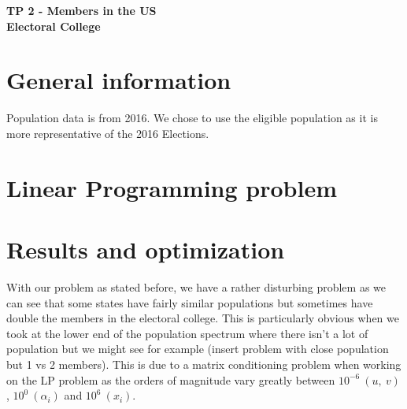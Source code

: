 \documentclass[a4paper,10pt,calibri,oneside,openany, twocolumn]{report}
\theoremstyle{break}
\begin{document}
	\begin{center}
		\bfseries TP 2 - Members in the US\\ Electoral College
	\end{center}
\section*{General information}
Population data is from 2016. We chose to use the eligible population as it is more representative of the 2016 Elections.
\section*{Linear Programming problem}
\section*{Results and optimization}
\qquad With our problem as stated before, we have a rather disturbing problem as we can see that some states have fairly similar populations but sometimes have double the members in the electoral college. This is particularly obvious when we took at the lower end of the population spectrum where there isn't a lot of population but we might see for example (insert problem with close population but 1 vs 2 members). This is due to a matrix conditioning problem when working on the LP problem as the orders of magnitude vary greatly between $10^{-6}\ (u,\ v)$, $10^0\ (\alpha_i)$ and $10^6\ (x_i)$.\\
\end{document}
